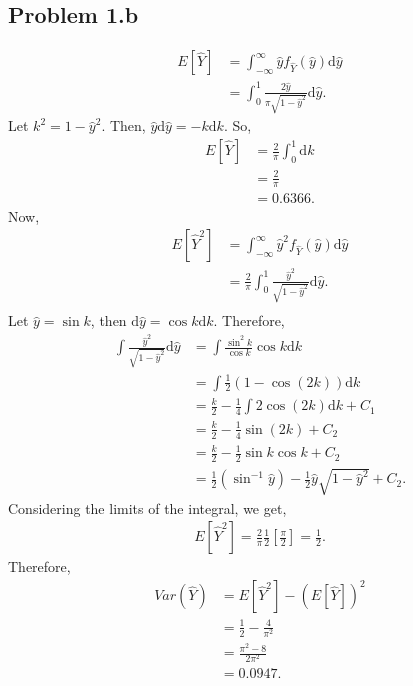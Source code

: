 \subsection*{Problem 1.b}
\begin{align*}
	E[\hat{Y}] &= \int_{-\infty}^{\infty} \hat{y}f_{\hat{Y}}(\hat{y})\text{d}\hat{y}\\
	&= \int_{0}^{1}\frac{2\hat{y}}{\pi\sqrt{1-\hat{y}^2}}\text{d}\hat{y}.
\end{align*}
Let $k^2 = 1-\hat{y}^2$. Then, $\hat{y}\text{d}\hat{y} = -k\text{d}k$.
So,
\begin{align*}
	E[\hat{Y}] &= \frac{2}{\pi}\int_{0}^{1}\text{d}k\\
	&= \frac{2}{\pi}\\
	&= 0.6366.
\end{align*}
Now,
\begin{align*}
	E[\hat{Y}^2] &= \int_{-\infty}^{\infty} \hat{y}^2f_{\hat{Y}}(\hat{y})\text{d}\hat{y}\\
	&= \frac{2}{\pi}\int_{0}^{1}\frac{\hat{y}^2}{\sqrt{1-\hat{y}^2}}\text{d}\hat{y}.\\
\end{align*}
Let $\hat{y} = \sin k$, then $\text{d}\hat{y} = \cos k \text{d}k$. Therefore,
\begin{align*}
	\int \frac{\hat{y}^2}{\sqrt{1-\hat{y}^2}}\text{d}\hat{y} &= \int \frac{\sin^2 k}{\cos k}\cos k\text{d}k\\
	&= \int \frac{1}{2}(1-\cos (2k))\text{d}k\\
	&= \frac{k}{2}-\frac{1}{4}\int 2 \cos (2k)\text{d}k+C_1\\
	&= \frac{k}{2}-\frac{1}{4}\sin (2k)+C_2\\
	&= \frac{k}{2}-\frac{1}{2}\sin k \cos k + C_2\\
	&= \frac{1}{2}(\sin^{-1}\hat{y})-\frac{1}{2}\hat{y}\sqrt{1-\hat{y}^2}+C_2.
\end{align*}
Considering the limits of the integral, we get,
\begin{align*}
	E[\hat{Y}^2] = \frac{2}{\pi}\frac{1}{2}\left[\frac{\pi}{2}\right] = \frac{1}{2}.
\end{align*}
Therefore,
\begin{align*}
	Var(\hat{Y}) &= E[\hat{Y}^2]-(E[\hat{Y}])^2\\
	&= \frac{1}{2}-\frac{4}{\pi^2}\\
	&= \frac{\pi^2-8}{2\pi^2}\\
	&= 0.0947.
\end{align*}
